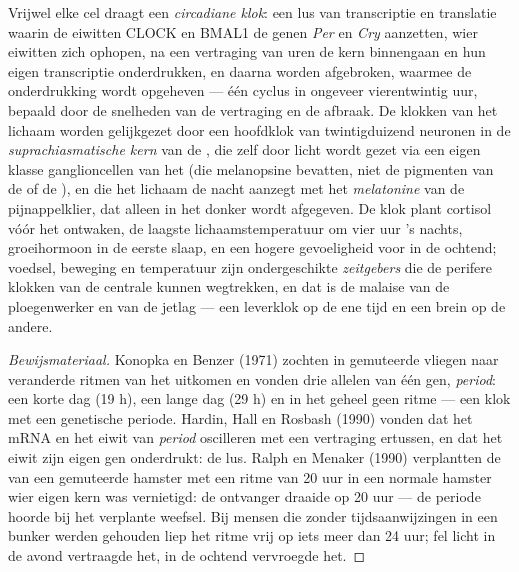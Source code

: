 \begin{definition}\label{def:b3:endocrinology:clock}
Vrijwel elke cel draagt een \emph{circadiane klok}: een lus van
transcriptie en translatie waarin de eiwitten CLOCK en BMAL1 de genen
\emph{Per} en \emph{Cry} aanzetten, wier eiwitten zich ophopen, na een
vertraging van uren de kern binnengaan en hun eigen transcriptie
onderdrukken, en daarna worden afgebroken, waarmee de onderdrukking
wordt opgeheven --- één cyclus in ongeveer vierentwintig uur, bepaald
door de snelheden van de vertraging en de afbraak. De klokken van het
lichaam worden gelijkgezet door een hoofdklok van twintigduizend
neuronen in de \emph{suprachiasmatische kern} van de , die
zelf door licht wordt gezet via een eigen klasse ganglioncellen van het
 (die melanopsine bevatten, niet de pigmenten van de 
of de ), en die het lichaam de nacht aanzegt met het
\emph{melatonine} van de pijnappelklier, dat alleen in het donker wordt
afgegeven. De klok plant cortisol vóór het ontwaken, de laagste
lichaamstemperatuur om vier uur 's nachts, groeihormoon in de eerste
slaap, en een hogere gevoeligheid voor  in de ochtend; voedsel,
beweging en temperatuur zijn ondergeschikte \emph{zeitgebers} die de
perifere klokken van de centrale kunnen wegtrekken, en dat is de
malaise van de ploegenwerker en van de jetlag --- een leverklok op de
ene tijd en een brein op de andere.
\end{definition}

\begin{proof}[Bewijsmateriaal]
Konopka en Benzer (1971) zochten in gemuteerde vliegen naar veranderde
ritmen van het uitkomen en vonden drie allelen van één gen,
\emph{period}: een korte dag (19 h), een lange dag (29 h) en in het
geheel geen ritme --- een klok met een genetische periode. Hardin, Hall
en Rosbash (1990) vonden dat het mRNA en het eiwit van \emph{period}
oscilleren met een vertraging ertussen, en dat het eiwit zijn eigen gen
onderdrukt: de lus. Ralph en Menaker (1990) verplantten de
 van een gemuteerde hamster met een ritme van 20
uur in een normale hamster wier eigen kern was vernietigd: de ontvanger
draaide op 20 uur --- de periode hoorde bij het verplante weefsel. Bij
mensen die zonder tijdsaanwijzingen in een bunker werden gehouden liep
het ritme vrij op iets meer dan 24 uur; fel licht in de avond
vertraagde het, in de ochtend vervroegde het.
\end{proof}

